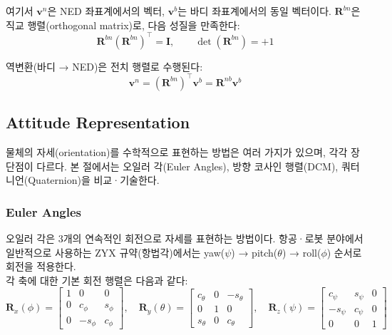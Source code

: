             \noindent 여기서 $\mathbf{v}^n$은 NED 좌표계에서의 벡터, $\mathbf{v}^b$는 바디 좌표계에서의 동일 벡터이다. $\mathbf{R}^{bn}$은 직교 행렬(orthogonal matrix)로, 다음 성질을 만족한다:\\

            \begin{equation}
                \mathbf{R}^{bn} (\mathbf{R}^{bn})^\top = \mathbf{I}, \qquad \det(\mathbf{R}^{bn}) = +1
                \label{eq:dcm_property}
            \end{equation}

            역변환(바디 → NED)은 전치 행렬로 수행된다:\\

            \begin{equation}
                \mathbf{v}^n = (\mathbf{R}^{bn})^\top \mathbf{v}^b = \mathbf{R}^{nb} \mathbf{v}^b
                \label{eq:frame_inverse}
            \end{equation}

    \subsection{Attitude Representation}
        물체의 자세(orientation)를 수학적으로 표현하는 방법은 여러 가지가 있으며, 각각 장단점이 다르다. 본 절에서는 오일러 각(Euler Angles), 방향 코사인 행렬(DCM), 쿼터니언(Quaternion)을 비교·기술한다.\\

        \subsubsection{Euler Angles}
            오일러 각은 3개의 연속적인 회전으로 자세를 표현하는 방법이다. 항공·로봇 분야에서 일반적으로 사용하는 ZYX 규약(항법각)에서는 yaw($\psi$) → pitch($\theta$) → roll($\phi$) 순서로 회전을 적용한다.\\

            각 축에 대한 기본 회전 행렬은 다음과 같다:\\

            \begin{equation}
                \mathbf{R}_x(\phi) = \begin{bmatrix} 1 & 0 & 0 \\ 0 & c_\phi & s_\phi \\ 0 & -s_\phi & c_\phi \end{bmatrix}, \quad
                \mathbf{R}_y(\theta) = \begin{bmatrix} c_\theta & 0 & -s_\theta \\ 0 & 1 & 0 \\ s_\theta & 0 & c_\theta \end{bmatrix}, \quad
                \mathbf{R}_z(\psi) = \begin{bmatrix} c_\psi & s_\psi & 0 \\ -s_\psi & c_\psi & 0 \\ 0 & 0 & 1 \end{bmatrix}
                \label{eq:basic_rotations}
            \end{equation}

